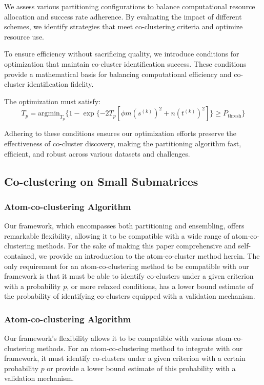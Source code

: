 We assess various partitioning configurations to balance computational resource allocation and success rate adherence. By evaluating the impact of different schemes, we identify strategies that meet co-clustering criteria and optimize resource use.

To ensure efficiency without sacrificing quality, we introduce conditions for optimization that maintain co-cluster identification success. These conditions provide a mathematical basis for balancing computational efficiency and co-cluster identification fidelity.

The optimization must satisfy:
\begin{equation}
    \label{eq:optimization_condition}
    T_p = \text{argmin}_{T_p} \{
    1 - \exp \{ -2 T_p [\phi m (s^{(k)})^2 + n (t^{(k)})^2] \} \ge P_{\text{thresh}} \}
\end{equation}

Adhering to these conditions ensures our optimization efforts preserve the effectiveness of co-cluster discovery, making the partitioning algorithm fast, efficient, and robust across various datasets and challenges.

\subsection{Co-clustering on Small Submatrices}

\subsubsection{Atom-co-clustering Algorithm}
Our framework, which encompasses both partitioning and ensembling, offers remarkable flexibility, allowing it to be compatible with a wide range of atom-co-clustering methods. For the sake of making this paper comprehensive and self-contained, we provide an introduction to the atom-co-cluster method herein. The only requirement for an atom-co-clustering method to be compatible with our framework is that it must be able to identify co-clusters under a given criterion with a probability $p$, or more relaxed conditions, has a lower bound estimate of the probability of identifying co-clusters equipped with a validation mechanism.

\subsubsection{Atom-co-clustering Algorithm}
Our framework's flexibility allows it to be compatible with various atom-co-clustering methods. For an atom-co-clustering method to integrate with our framework, it must identify co-clusters under a given criterion with a certain probability $p$ or provide a lower bound estimate of this probability with a validation mechanism.

